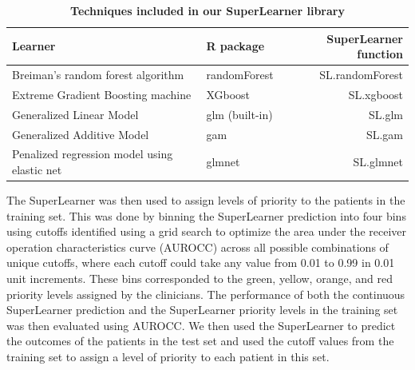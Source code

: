 \documentclass[10pt,letterpaper]{article}\usepackage[]{graphicx}\usepackage[]{color}
\begin{document}
\begin{table}[h!]
  \begin{adjustwidth}{-0.25in}{0in}
  \caption{\bf Techniques included in our SuperLearner library}
  \label{tab:superlearner-library}
  \begin{tabular}{llr}
    \hline
    Learner                                       & R package                        & SuperLearner function \\
    \hline
    Breiman's random forest algorithm             & randomForest \cite{randomforest} & SL.randomForest \\
    Extreme Gradient Boosting machine             & XGboost \cite{xgboost}           & SL.xgboost \\
    Generalized Linear Model                      & glm (built-in)                   & SL.glm \\
    Generalized Additive Model                    & gam       \cite{gam}             & SL.gam \\
    Penalized regression model using elastic net  & glmnet \cite{glmnet}             & SL.glmnet \\
    \hline
  \end{tabular}
  \end{adjustwidth}
\end{table}

The SuperLearner was then used to assign levels of priority to the patients in
the training set. This was done by binning the SuperLearner prediction into four
bins using cutoffs identified using a grid search to optimize the area under the
receiver operation characteristics curve (AUROCC) across all possible
combinations of unique cutoffs, where each cutoff could take any value from 0.01
to 0.99 in 0.01 unit increments. These bins corresponded to the green, yellow,
orange, and red priority levels assigned by the clinicians. The performance of
both the continuous SuperLearner prediction and the SuperLearner priority levels
in the training set was then evaluated using AUROCC. We then used the
SuperLearner to predict the outcomes of the patients in the test set and used
the cutoff values from the training set to assign a level of priority to each
patient in this set.
\end{document}
